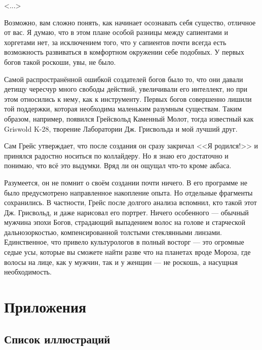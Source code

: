 \documentclass[a4paper,10pt]{book}
\begin{document}
<...>

Возможно, вам сложно понять, как начинает осознавать себя существо, отличное от 
вас.
Я думаю, что в этом плане особой разницы между сапиентами и хоргетами нет,
за исключением того, что у сапиентов почти всегда есть возможность развиваться
в комфортном окружении себе подобных. У первых богов такой роскоши, увы, не 
было.

Самой распространённой ошибкой создателей богов было то, что они 
давали детищу чересчур много свободы действий, увеличивали его
интеллект, но при этом относились к нему, как к инструменту. 
Первых богов совершенно лишили той поддержки, которая необходима маленьким 
разумным существам. 
Таким образом, например, появился Грейсвольд Каменный Молот, 
тогда известный как Griswold K-28, творение Лаборатории Дж. Грисвольда и мой 
лучший друг.

Сам Грейс утверждает, что после создания он сразу закричал <<Я родился!>> и 
принялся радостно носиться по коллайдеру. Но я знаю его достаточно и понимаю, 
что всё это выдумки. Вряд ли он ощущал что-то кроме акбаса.

Разумеется, он не помнит о своём создании почти ничего. В его программе не было 
предусмотрено направленное накопление опыта. Но отдельные фрагменты 
сохранились. В частности, Грейс после долгого анализа вспомнил, кто такой этот 
Дж. Грисвольд, и даже нарисовал его портрет. Ничего особенного --- обычный 
мужчина эпохи Богов, страдающий выпадением волос на голове и старческой 
дальнозоркостью,
компенсированной толстыми стеклянными линзами. 
Единственное, что привело культурологов в полный восторг --- это огромные седые 
усы, которые вы сможете найти разве что на планетах вроде Мороза, где волосы на 
лице, как у мужчин, так и у женщин --- не роскошь, а насущная необходимость.

\chapter{Приложения}

\section{Список иллюстраций}
\end{document}
